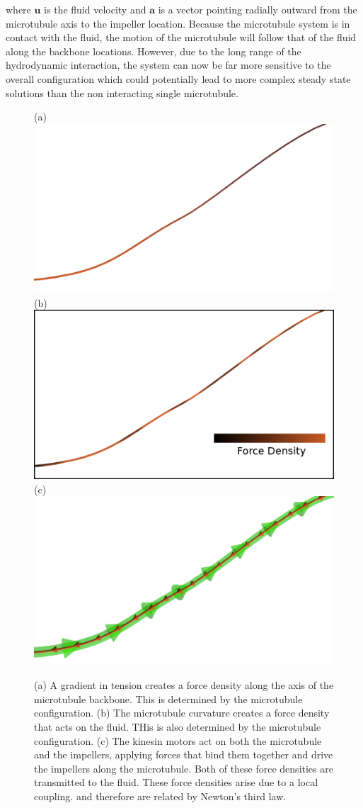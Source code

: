 \documentclass[11pt]{ucthesis}
\begin{document}
{\begin{equation}
\end{equation}
where $ \mathbf{u}$ is the fluid velocity and $ \mathbf{a}$ is a vector pointing radially outward from the microtubule axis to the impeller location. 
Because the microtubule system is in contact with the fluid, the motion of the microtubule will follow that of the fluid along the backbone locations.
However, due to the long range of the hydrodynamic interaction, the system can now be far more sensitive to the overall configuration which could potentially lead to more complex steady state solutions than the non interacting single microtubule.


\begin{figure}[htp]
\begin{center}
(a)
\includegraphics[width=0.45\hsize]{gradforces.png}
(b)
\includegraphics[width=0.45\hsize]{stiffforces2.png}
(c)
\includegraphics[width=0.45\hsize]{ktforces.png}
\caption{ 
(a)
A gradient in tension creates a force density along the axis of the microtubule backbone. This is determined by the microtubule configuration.
(b)
The microtubule curvature creates a force density that acts on the fluid. THis is also determined by the microtubule configuration.
(c)
The kinesin motors act on both the microtubule and the impellers, applying forces that bind them together and drive the impellers along the microtubule. Both of these force densities are transmitted to the fluid. These force densities arise due to a local coupling. and therefore are related by Newton's third law.
}
\label{fig:forcedensities}
\end{center}
\end{figure}

}
\end{document}
